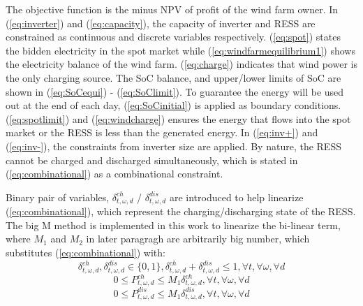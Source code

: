 \documentclass[final,5p,times,twocolumn,authoryear]{elsarticle}
\begin{document}
The objective function is the minus NPV of profit of the wind farm owner. In (\ref{eq:inverter}) and  (\ref{eq:capacity}), the capacity of inverter and RESS are constrained as continuous and discrete variables respectively. (\ref{eq:spot}) states the bidden electricity in the spot market while  (\ref{eq:windfarmequilibrium1}) shows the electricity balance of the wind farm. (\ref{eq:charge}) indicates that wind power is the only charging source. The SoC balance, and upper/lower limits of SoC are shown in  (\ref{eq:SoCequi}) - (\ref{eq:SoClimit}). To guarantee the energy will be used out at the end of each day, (\ref{eq:SoCinitial}) is applied as boundary conditions. (\ref{eq:spotlimit}) and (\ref{eq:windcharge}) ensures the energy that flows into the spot market or the RESS is less than the generated energy. In (\ref{eq:inv+}) and (\ref{eq:inv-}), the constraints from inverter size are applied. By nature, the RESS cannot be charged and discharged simultaneously, which is stated in (\ref{eq:combinational}) as a combinational constraint.

Binary pair of variables, $\delta_{t,\omega,d}^{ch}$ / $\delta_{t,\omega,d}^{dis}$ are introduced to help linearize (\ref{eq:combinational}), which represent the charging/discharging state of the RESS. The big M method is implemented in this work to linearize the bi-linear term, where $M_1$ and $M_2$ in later paragragh are arbitrarily big number, which substitutes (\ref{eq:combinational}) with:
\begin{equation} \label{eq:binary}
\delta_{t,\omega,d}^{ch},\delta_{t,\omega,d}^{dis} \in \{0,1\}, \delta_{t,\omega,d}^{ch}+\delta_{t,\omega,d}^{dis} \leq 1, \forall t,\forall \omega,\forall d
\end{equation}
\begin{equation} \label{eq:bigM3}
0 \leq  P_{t,\omega,d}^{ch} \leq M_1 \delta_{t,\omega,d}^{ch}, \forall t,\forall \omega,\forall d
\end{equation}
\begin{equation} \label{eq:bigM4}
0 \leq  P_{t,\omega,d}^{dis} \leq M_1\delta_{t,\omega,d}^{dis}, \forall t,\forall \omega,\forall d
\end{equation}
\end{document}
